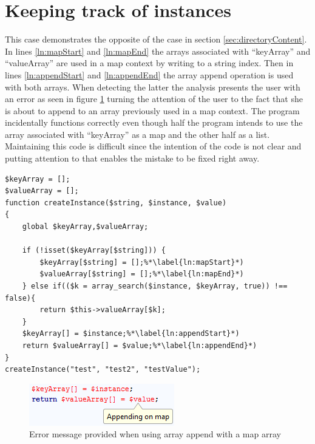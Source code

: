 \section{Keeping track of instances}
This case demonstrates the opposite of the case in section \ref{sec:directoryContent}. In lines \ref{ln:mapStart} and \ref{ln:mapEnd} the arrays associated with ``keyArray'' and ``valueArray'' are used in a map context by writing to a string index. Then in lines \ref{ln:appendStart} and \ref{ln:appendEnd} the array append operation is used with both arrays. When detecting the latter the analysis presents the user with an error as seen in figure \ref{fig:typeHandlerScreenshot} turning the attention of the user to the fact that she is about to append to an array previously used in a map context. The program incidentally functions correctly even though half the program intends to use the array associated with ``keyArray'' as a map and the other half as a list. Maintaining this code is difficult since the intention of the code is not clear and putting attention to that enables the mistake to be fixed right away.

\begin{program}
\begin{lstlisting}
$keyArray = [];
$valueArray = [];
function createInstance($string, $instance, $value)
{
    global $keyArray,$valueArray;

    if (!isset($keyArray[$string])) { 
        $keyArray[$string] = [];%*\label{ln:mapStart}*)
        $valueArray[$string] = [];%*\label{ln:mapEnd}*)
    } else if(($k = array_search($instance, $keyArray, true)) !== false){
        return $this->valueArray[$k];
    }
    $keyArray[] = $instance;%*\label{ln:appendStart}*)
    return $valueArray[] = $value;%*\label{ln:appendEnd}*)
}
createInstance("test", "test2", "testValue");
\end{lstlisting}
\caption{}
\label{lst:typeHandler}
\end{program}

\begin{figure}
\centering
\includegraphics[scale=0.6]{chapters/caseStudy/typeHandlerError}
\caption{Error message provided when using array append with a map array}
\label{fig:typeHandlerScreenshot}
\end{figure}
